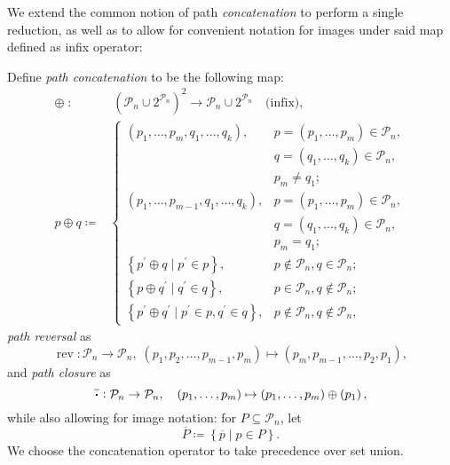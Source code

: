\documentclass[titlepage,twoside,index=totoc,bibliography=totoc]{scrartcl}
\newcommand*{\Cdot}{\raisebox{-0.30ex}{\scalebox{1.5}{$\cdot$}}}
\numberwithin{equation}{section}
\numberwithin{figure}{section}
\numberwithin{table}{section}
\let\defstyle\itshape
\begin{document}
We extend the common notion of path {\defstyle concatenation}
to perform a single reduction, as well as to allow for convenient notation for
images under said map defined as infix operator:
\begin{define}
\label{def:pathop}
  Define {\defstyle path concatenation} to be the following map:
  \[
    \begin{split}
    \oplus \; : & \; {\left( \mathcal{P}_n \cup 2^{\mathcal{P}_n} \right)}^2 \to
                       \mathcal{P}_n \cup 2^{\mathcal{P}_n} \quad \text{(infix)},
    \\
    p \oplus q \coloneqq &
    \begin{cases}
      \left(p_1,\ldots,p_m,q_1,\ldots,q_k\right),
      & p = \left(p_1,\ldots,p_m\right) \in \mathcal{P}_n, \\
      & q = \left(q_1,\ldots,q_k\right) \in \mathcal{P}_n, \\
      & p_m \neq q_1;
      \\
      \left(p_1,\ldots,p_{m-1},q_1,\ldots,q_k\right),
      & p = \left(p_1,\ldots,p_m\right) \in \mathcal{P}_n, \\
      & q = \left(q_1,\ldots,q_k\right) \in \mathcal{P}_n, \\
      & p_m = q_1;
      \\
      \left\{p^\prime \oplus q \; \vert \; p^\prime \in p\right\},
      & p \notin \mathcal{P}_n, q \in \mathcal{P}_n;
      \\
      \left\{p \oplus q^\prime \; \vert \; q^\prime \in q\right\},
      & p \in \mathcal{P}_n, q \notin \mathcal{P}_n;
      \\
      \left\{p^\prime \oplus q^\prime \; \vert \; p^\prime \in p, q^\prime \in q\right\},
      & p \notin \mathcal{P}_n, q \notin \mathcal{P}_n,
    \end{cases}
    \end{split}
  \]
  {\defstyle path reversal} as
  \[
    \operatorname{rev} : \mathcal{P}_n \to \mathcal{P}_n, \;
    \left(p_1,p_2,\ldots,p_{m-1},p_m\right) \mapsto \left(p_m,p_{m-1},\ldots,p_2,p_1\right),
  \]
  and {\defstyle path closure} as
  \[
    \overline{\Cdot} : \mathcal{P}_n \to \mathcal{P}_n,
    \quad \left(p_1,\ldots,p_m\right) \mapsto
    \left(p_1,\ldots,p_m\right) \oplus \left(p_1\right),
  \]
  while also allowing for image notation:
  for $P \subseteq \mathcal{P}_n$, let
  \[
    \overline{P} \coloneqq \left\{\overline{p} \mid p \in P\right\}.
  \]
  We choose the concatenation operator to take precedence over set union.
\end{define}
\end{document}
